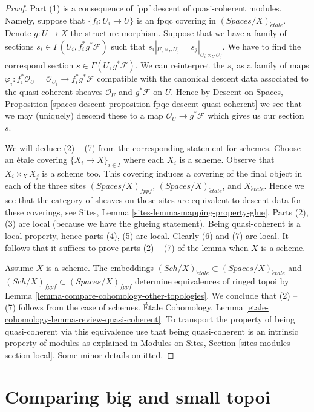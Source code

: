 \documentclass{stacks-project}
\theoremstyle{plain}
\theoremstyle{definition}
\theoremstyle{remark}
\numberwithin{equation}{subsection}
\def\Sch{\mathit{Sch}}
\def\etale{{\acute{e}tale}}
\begin{document}
\begin{proof}
Part (1) is a consequence of fppf descent of quasi-coherent modules.
Namely, suppose that $\{f_i : U_i \to U\}$ is an fpqc covering
in $(\textit{Spaces}/X)_\etale$. Denote $g : U \to X$ the structure
morphism. Suppose that
we have a family of sections $s_i \in \Gamma(U_i , f_i^*g^*\mathcal{F})$
such that $s_i|_{U_i \times_U U_j} = s_j|_{U_i \times_U U_j}$.
We have to find the correspond section $s \in \Gamma(U, g^*\mathcal{F})$.
We can reinterpret the $s_i$ as a family of maps
$\varphi_i : f_i^*\mathcal{O}_U = \mathcal{O}_{U_i} \to f_i^*g^*\mathcal{F}$
compatible with the canonical descent data associated to the
quasi-coherent sheaves $\mathcal{O}_U$ and $g^*\mathcal{F}$ on $U$.
Hence by Descent on Spaces, Proposition
\ref{spaces-descent-proposition-fpqc-descent-quasi-coherent}
we see that we may (uniquely) descend
these to a map $\mathcal{O}_U \to g^*\mathcal{F}$ which gives
us our section $s$.

\medskip\noindent
We will deduce (2) -- (7) from the corresponding statement for schemes.
Choose an \'etale covering $\{X_i \to X\}_{i \in I}$
where each $X_i$ is a scheme. Observe that $X_i \times_X X_j$
is a scheme too. This covering induces a covering of
the final object in each of the three sites
$(\textit{Spaces}/X)_{fppf}$, $(\textit{Spaces}/X)_\etale$, and $X_\etale$.
Hence we see that the category of sheaves on these sites
are equivalent to descent data for these coverings, see
Sites, Lemma \ref{sites-lemma-mapping-property-glue}.
Parts (2), (3) are local (because we have the glueing statement).
Being quasi-coherent is a local property, hence parts
(4), (5) are local. Clearly (6) and (7) are local.
It follows that it suffices to prove parts (2) -- (7)
of the lemma when $X$ is a scheme.

\medskip\noindent
Assume $X$ is a scheme. The embeddings
$(\Sch/X)_\etale \subset (\textit{Spaces}/X)_\etale$ and
$(\Sch/X)_{fppf} \subset (\textit{Spaces}/X)_{fppf}$
determine equivalences of ringed topoi by
Lemma \ref{lemma-compare-cohomology-other-topologies}.
We conclude that (2) -- (7) follows from the case of schemes.
\'Etale Cohomology, Lemma
\ref{etale-cohomology-lemma-review-quasi-coherent}.
To transport the property of being quasi-coherent via
this equivalence use that being quasi-coherent is an
intrinsic property of modules as explained in
Modules on Sites, Section \ref{sites-modules-section-local}.
Some minor details omitted.
\end{proof}

\section{Comparing big and small topoi}
\label{section-compare}
\end{document}
